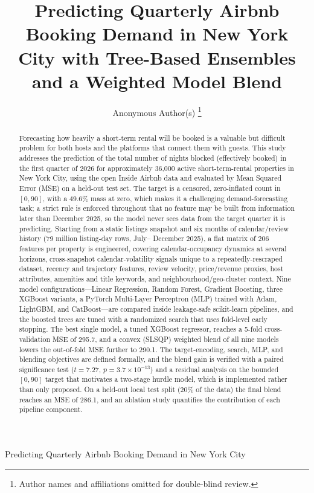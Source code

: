 \documentclass[journal]{IEEEtran}
\begin{document}
\title{Predicting Quarterly Airbnb Booking Demand in New York City with
Tree-Based Ensembles and a Weighted Model Blend}

\author{Anonymous Author(s)%
\thanks{Author names and affiliations omitted for double-blind review.}}

%
{Predicting Quarterly Airbnb Booking Demand in New York City}

\maketitle

\begin{abstract}
Forecasting how heavily a short-term rental will be booked is a valuable but
difficult problem for both hosts and the platforms that connect them with
guests. This study addresses the prediction of the total number of nights
blocked (effectively booked) in the first quarter of 2026 for approximately
36{,}000 active short-term-rental properties in New York City, using the open
Inside Airbnb data and evaluated by Mean Squared Error (MSE) on a held-out test
set. The target is a censored, zero-inflated count in $[0,90]$, with a
$49.6\%$ mass at zero, which makes it a challenging demand-forecasting task; a
strict rule is enforced throughout that no feature may be built from
information later than December 2025, so the model never sees data from the
target quarter it is predicting. Starting from a static listings snapshot and
six months of calendar/review history (79 million listing-day rows, July--
December 2025), a flat matrix of 206 features per property is engineered,
covering calendar-occupancy dynamics at several horizons, cross-snapshot
calendar-volatility signals unique to a repeatedly-rescraped dataset, recency
and trajectory features, review velocity, price/revenue proxies, host
attributes, amenities and title keywords, and neighbourhood/geo-cluster
context. Nine model configurations---Linear Regression, Random Forest,
Gradient Boosting, three XGBoost variants, a PyTorch Multi-Layer Perceptron
(MLP) trained with Adam, LightGBM, and CatBoost---are compared inside
leakage-safe scikit-learn pipelines, and the boosted trees are tuned with a
randomized search that uses fold-level early stopping. The best single model, a
tuned XGBoost regressor, reaches a 5-fold cross-validation MSE of 295.7, and a
convex (SLSQP) weighted blend of all nine models lowers the out-of-fold MSE
further to 290.1. The target-encoding, search, MLP, and blending objectives are
defined formally, and the blend gain is verified with a paired significance
test ($t=7.27$, $p=3.7\times10^{-13}$) and a residual analysis on the bounded
$[0,90]$ target that motivates a two-stage hurdle model, which is implemented
rather than only proposed. On a held-out local test split (20\% of the data)
the final blend reaches an MSE of 286.1, and an ablation study quantifies the
contribution of each pipeline component.
\end{abstract}
\end{document}
